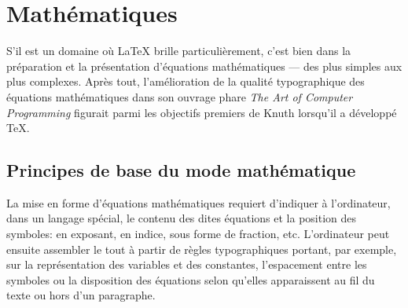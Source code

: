 
\chapter{Mathématiques}
\label{chap:math}


S'il est un domaine où {\LaTeX} brille particulièrement, c'est bien
dans la préparation et la présentation d'équations mathématiques ---
des plus simples aux plus complexes. Après tout, l'amélioration de la
qualité typographique des équations mathématiques dans son ouvrage
phare \emph{The Art of Computer Programming} figurait parmi les
objectifs premiers de Knuth lorsqu'il a développé {\TeX}.


\section{Principes de base du mode mathématique}
\label{sec:math:base}

La mise en forme d'équations mathématiques requiert d'indiquer à
l'ordinateur, dans un langage spécial, le contenu des dites équations
et la position des symboles: en exposant, en indice, sous forme de
fraction, etc. L'ordinateur peut ensuite assembler le tout à partir de
règles typographiques portant, par exemple, sur la représentation des
variables et des constantes, l'espacement entre les symboles ou la
disposition des équations selon qu'elles apparaissent au fil du texte
ou hors d'un paragraphe.

